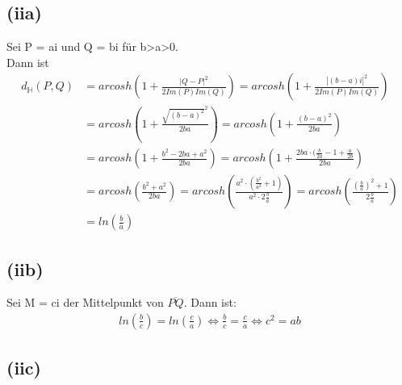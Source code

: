 \documentclass[12pt,a4paper]{article}
\begin{document}
\subsection*{(iia)}
Sei P = ai und Q = bi für b>a>0.\\
Dann ist 
\begin{align*}
    d_{\mathbb{H}}(P, Q) &= arcosh \left( 1 + \frac{|Q - P|^{2}}{2Im(P)Im(Q)} \right) =arcosh \left( 1 + \frac{|(b-a)i|^{2}}{2Im(P)Im(Q)} \right) \\
                         &= arcosh \left( 1 + \frac{\sqrt{(b - a)^2}^{2}}{2ba} \right) = arcosh \left( 1 + \frac{(b - a)^{2}}{2ba} \right) \\
                         &= arcosh \left( 1 + \frac{b^2 - 2ba + a^2}{2ba} \right) = arcosh \left( 1 + \frac{2ba \cdot (\frac{b}{2a} - 1 + \frac{a}{2b}}{2ba} \right) \\
                         &= arcosh \left( \frac{b^2 + a^2}{2ba} \right) = arcosh \left( \frac{a^2 \cdot (\frac{b^2}{a^2} + 1)}{a^2 \cdot 2 \frac{b}{a}} \right) = arcosh \left( \frac{\left(\frac{b}{a}\right)^2 + 1}{2 \frac{b}{a}} \right) \\ 
                         &= ln\left( \frac{b}{a} \right)
\end{align*}

\subsection*{(iib)}
Sei M = ci der Mittelpunkt von $\overline{PQ}$. Dann ist: \\
\begin{align*}
ln\left(\frac{b}{c}\right) = ln\left(\frac{c}{a}\right) \Leftrightarrow \frac{b}{c} = \frac{c}{a} \Leftrightarrow c^2 = ab
\end{align*}

\subsection*{(iic)}
\end{document}

